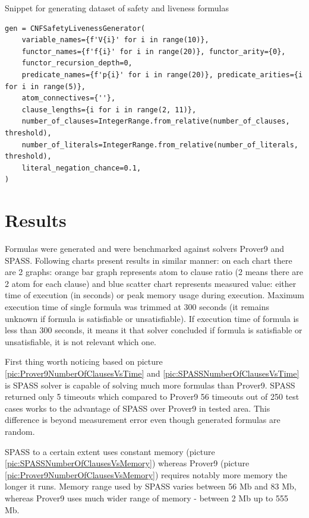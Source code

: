 \begin{listing}[ht]
  \caption{Snippet for generating dataset of safety and liveness formulas}
  \label{lis:CNFSafetyLivenesSnippet}
\begin{verbatim}
gen = CNFSafetyLivenessGenerator(
    variable_names={f'V{i}' for i in range(10)},
    functor_names={f'f{i}' for i in range(20)}, functor_arity={0},
    functor_recursion_depth=0,
    predicate_names={f'p{i}' for i in range(20)}, predicate_arities={i for i in range(5)},
    atom_connectives={''},
    clause_lengths={i for i in range(2, 11)},
    number_of_clauses=IntegerRange.from_relative(number_of_clauses, threshold),
    number_of_literals=IntegerRange.from_relative(number_of_literals, threshold),
    literal_negation_chance=0.1,
)
\end{verbatim}
\end{listing}

\section{Results}

Formulas were generated and were benchmarked against solvers Prover9 and SPASS. Following charts present results in similar manner: on each chart there are 2 graphs: orange bar graph represents atom to clause ratio (2 means there are 2 atom for each clause) and blue scatter chart represents measured value: either time of execution (in seconds) or peak memory usage during execution. Maximum execution time of single formula was trimmed at 300 seconds (it remains unknown if formula is satisfiable or unsatisfiable). If execution time of formula is less than 300 seconds, it means it that solver concluded if formula is satisfiable or unsatisfiable, it is not relevant which one.

First thing worth noticing based on picture \ref{pic:Prover9NumberOfClausesVsTime} and \ref{pic:SPASSNumberOfClausesVsTime} is SPASS solver is capable of solving much more formulas than Prover9. SPASS returned only 5 timeouts which compared to Prover9 56 timeouts out of 250 test cases works to the advantage of SPASS over Prover9 in tested area. This difference is beyond measurement error even though generated formulas are random. 

SPASS to a certain extent uses constant memory (picture \ref{pic:SPASSNumberOfClausesVsMemory}) whereas Prover9 (picture \ref{pic:Prover9NumberOfClausesVsMemory}) requires notably more memory the longer it runs. Memory range used by SPASS varies between 56 Mb and 83 Mb, whereas Prover9 uses much wider range of memory - between 2 Mb up to 555 Mb.

